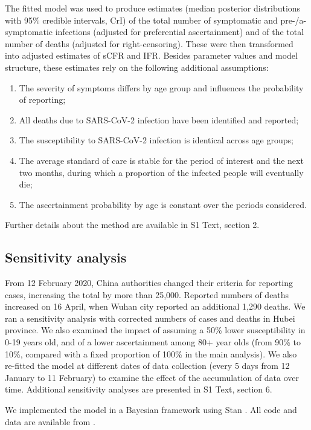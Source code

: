\documentclass{article}
\begin{document}
The fitted model was used to produce estimates (median posterior distributions with 95\% credible intervals, CrI) of the total number of symptomatic and pre-/a-symptomatic infections (adjusted for preferential ascertainment) and of the total number of deaths (adjusted for right-censoring). These were then transformed into adjusted estimates of sCFR and IFR.
Besides parameter values and model structure, these estimates rely on the following additional assumptions:
\begin{enumerate}
	\item The severity of symptoms differs by age group and influences the probability of reporting;
	\item All deaths due to SARS-CoV-2 infection have been identified and reported;
	\item The susceptibility to SARS-CoV-2 infection is identical across age groups;
	\item The average standard of care is stable for the period of interest and the next two months, during which a proportion of the infected people will eventually die;
	\item The ascertainment probability by age is constant over the periods considered.
\end{enumerate}
Further details about the method are available in S1 Text, section 2. 

\subsection*{Sensitivity analysis}

From 12 February 2020, China authorities changed their criteria for reporting cases, increasing the total by more than 25,000. 
Reported numbers of deaths increased on 16 April, when Wuhan city reported an additional 1,290 deaths. 
We ran a sensitivity analysis with corrected numbers of cases and deaths in Hubei province. 
We also examined the impact of assuming a 50\% lower susceptibility in 0-19 years old, and of a lower ascertainment among 80+ year olds (from 90\% to 10\%, compared with a fixed proportion of 100\% in the main analysis). 
We also re-fitted the model at different dates of data collection (every 5 days from 12 January to 11 February) to examine the effect of the accumulation of data over time. 
Additional sensitivity analyses are presented in S1 Text, section 6.

We implemented the model in a Bayesian framework using Stan \cite{Carpenter2017}. 
All code and data are available from \underline{}.
\end{document}
